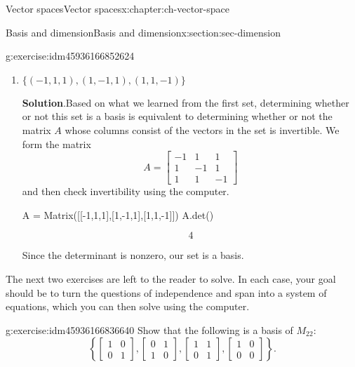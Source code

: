 \documentclass[oneside,10pt,]{book}
\newcommand{\blocktitlefont}{\relax}
\numberwithin{equation}{section}
\newcommand{\bbm}{\begin{bmatrix}}
\newcommand{\ebm}{\end{bmatrix}}
\newcommand{\R}{\mathbb{R}}
\newcommand{\amp}{&}
\begin{document}
\begin{chapterptx}{Vector spaces}{}{Vector spaces}{}{}{x:chapter:ch-vector-space}
\begin{sectionptx}{Basis and dimension}{}{Basis and dimension}{}{}{x:section:sec-dimension}
\begin{inlineexercise}{}{g:exercise:idm45936166852624}
\begin{enumerate}[font=\bfseries,label=(\alph*),ref=\alph*]
\begin{sageoutput}
\end{sageoutput}
Our set of vectors is therefore linearly independent. Now, to show that it spans, we need to show that for any vector \((a,b,c)\), the equation%
\begin{equation*}
x(1,1,0)+y(1,0,1)+z(0,1,1)=(a,b,c)
\end{equation*}
has a solution. But we know that this system has the same coefficient matrix as the one above, and that existence of a solution again follows from invertibility of \(A\), which we have already established.%
\par
Note that for three vectors in \(\R^3\), once independence has been confirmed, span is automatic. We will soon see that this is not a coincidence.%
\item{}\(\{(-1,1,1),(1,-1,1),(1,1,-1)\}\)%
\par\smallskip%
\noindent\textbf{\blocktitlefont Solution}.\label{g:solution:idm45936166839872}{}\hypertarget{g:solution:idm45936166839872}{}\quad{}Based on what we learned from the first set, determining whether or not this set is a basis is equivalent to determining whether or not the matrix \(A\) whose columns consist of the vectors in the set is invertible. We form the matrix%
\begin{equation*}
A = \bbm -1\amp 1\amp 1\\1\amp -1\amp 1\\1\amp 1\amp -1\ebm
\end{equation*}
and then check invertibility using the computer.%
\begin{sageinput}
A = Matrix([[-1,1,1],[1,-1,1],[1,1,-1]])
A.det()
\end{sageinput}
\begin{sageoutput}
\[4\]
\end{sageoutput}
Since the determinant is nonzero, our set is a basis.%
\end{enumerate}
\end{inlineexercise}%
The next two exercises are left to the reader to solve. In each case, your goal should be to turn the questions of independence and span into a system of equations, which you can then solve using the computer.%
\begin{inlineexercise}{}{g:exercise:idm45936166836640}%
Show that the following is a basis of \(M_{22}\):%
\begin{equation*}
\left\{\bbm 1\amp 0\\0\amp 1\ebm, \bbm 0\amp 1\\1\amp 0\ebm, \bbm 1\amp 1\\0\amp 1\ebm, \bbm 1\amp 0\\0\amp 0\ebm\right\}\text{.}

\end{equation*}
\end{inlineexercise}
\end{sectionptx}
\end{chapterptx}
\end{document}
